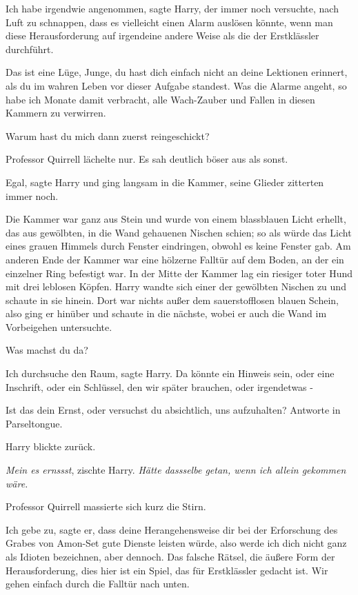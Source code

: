 \glqq{}Ich habe irgendwie angenommen\grqq{}, sagte Harry, der immer noch
versuchte, nach Luft zu schnappen, \glqq{}dass es vielleicht einen Alarm auslösen
könnte, wenn man diese Herausforderung auf irgendeine andere Weise als die der
Erstklässler durchführt.\grqq{}

\glqq{}Das ist eine Lüge, Junge, du hast dich einfach nicht an deine Lektionen
erinnert, als du im wahren Leben vor dieser Aufgabe standest. Was die Alarme
angeht, so habe ich Monate damit verbracht, alle Wach-Zauber und Fallen in
diesen Kammern zu verwirren.\grqq{}

\glqq{}Warum hast du mich dann zuerst reingeschickt?\grqq{}

Professor Quirrell lächelte nur. Es sah deutlich böser aus als sonst.

\glqq{}Egal\grqq{}, sagte Harry und ging langsam in die Kammer, seine Glieder
zitterten immer noch.

Die Kammer war ganz aus Stein und wurde von einem blassblauen Licht erhellt, das
aus gewölbten, in die Wand gehauenen Nischen schien; so als würde das Licht
eines grauen Himmels durch Fenster eindringen, obwohl es keine Fenster gab. Am
anderen Ende der Kammer war eine hölzerne Falltür auf dem Boden, an der ein
einzelner Ring befestigt war. In der Mitte der Kammer lag ein riesiger toter
Hund mit drei leblosen Köpfen. Harry wandte sich einer der gewölbten Nischen zu
und schaute in sie hinein. Dort war nichts außer dem sauerstofflosen blauen
Schein, also ging er hinüber und schaute in die nächste, wobei er auch die Wand
im Vorbeigehen untersuchte.

\glqq{}Was machst du da?\grqq{}

\glqq{}Ich durchsuche den Raum\grqq{}, sagte Harry. \glqq{}Da könnte ein Hinweis
sein, oder eine Inschrift, oder ein Schlüssel, den wir später brauchen, oder
irgendetwas -\grqq{}

\glqq{}Ist das dein Ernst, oder versuchst du absichtlich, uns aufzuhalten?
Antworte in Parseltongue.\grqq{}

Harry blickte zurück.

\glqq{}\emph{Mein es ernssst}\grqq{}, zischte Harry. \glqq{}\emph{Hätte dassselbe
getan, wenn ich allein gekommen wäre.}\grqq{}

Professor Quirrell massierte sich kurz die Stirn.

\glqq{}Ich gebe zu\grqq{}, sagte er, \glqq{}dass deine Herangehensweise dir bei
der Erforschung des Grabes von Amon-Set gute Dienste leisten würde, also werde
ich dich nicht ganz als Idioten bezeichnen, aber dennoch. Das falsche Rätsel,
die äußere Form der Herausforderung, dies hier ist ein Spiel, das für
Erstklässler gedacht ist. Wir gehen einfach durch die Falltür nach unten.\grqq{}

